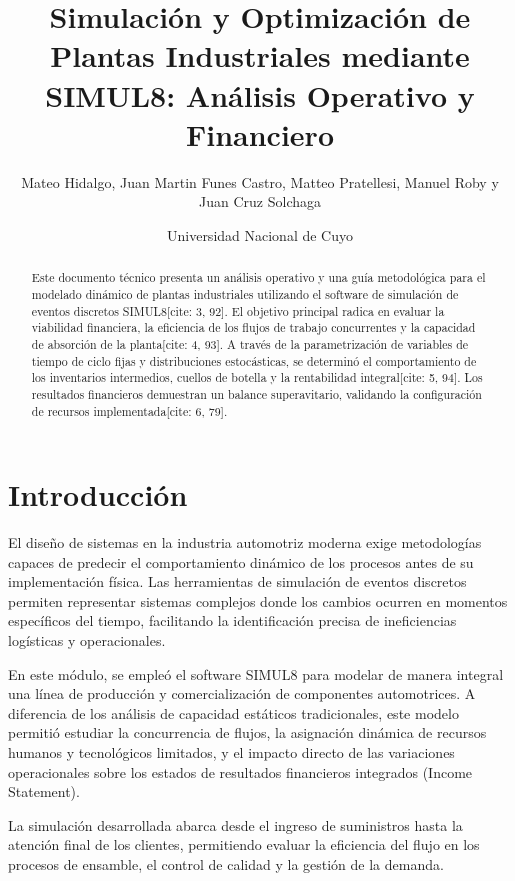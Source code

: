 \documentclass[11pt,a4paper]{article}
\title{Simulación y Optimización de Plantas Industriales mediante SIMUL8: Análisis Operativo y Financiero}
\author{Mateo Hidalgo, Juan Martin Funes Castro, Matteo Pratellesi, Manuel Roby y Juan Cruz Solchaga}
\date{Universidad Nacional de Cuyo}
\begin{document}
\maketitle

\begin{abstract}
Este documento técnico presenta un análisis operativo y una guía metodológica para el modelado dinámico de plantas industriales utilizando el software de simulación de eventos discretos SIMUL8[cite: 3, 92]. El objetivo principal radica en evaluar la viabilidad financiera, la eficiencia de los flujos de trabajo concurrentes y la capacidad de absorción de la planta[cite: 4, 93]. A través de la parametrización de variables de tiempo de ciclo fijas y distribuciones estocásticas, se determinó el comportamiento de los inventarios intermedios, cuellos de botella y la rentabilidad integral[cite: 5, 94]. Los resultados financieros demuestran un balance superavitario, validando la configuración de recursos implementada[cite: 6, 79].
\end{abstract}

\section{Introducción}
El diseño de sistemas en la industria automotriz moderna exige metodologías capaces de predecir el comportamiento dinámico de los procesos antes de su implementación física. Las herramientas de simulación de eventos discretos permiten representar sistemas complejos donde los cambios ocurren en momentos específicos del tiempo, facilitando la identificación precisa de ineficiencias logísticas y operacionales.

En este módulo, se empleó el software SIMUL8 para modelar de manera integral una línea de producción y comercialización de componentes automotrices. A diferencia de los análisis de capacidad estáticos tradicionales, este modelo permitió estudiar la concurrencia de flujos, la asignación dinámica de recursos humanos y tecnológicos limitados, y el impacto directo de las variaciones operacionales sobre los estados de resultados financieros integrados (Income Statement).

La simulación desarrollada abarca desde el ingreso de suministros hasta la atención final de los clientes, permitiendo evaluar la eficiencia del flujo en los procesos de ensamble, el control de calidad y la gestión de la demanda.
\end{document}
